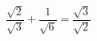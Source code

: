 $\dfrac{\sqrt{2}}{\sqrt{3}} + \dfrac{1}{\sqrt{6}} = \dfrac{\sqrt{3}}{\sqrt{2}}$

\begin{reponses}
\end{reponses}

